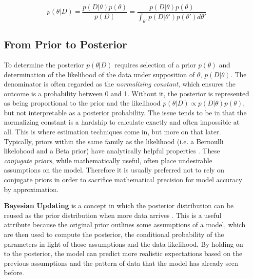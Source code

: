 $$
p(\theta|D) = \frac{p(D|\theta)p(\theta)}{p(D)} = \frac{p(D|\theta)p(\theta)}{\int_{\theta'} p(D|\theta')p(\theta')d\theta'}
$$


\subsection{From Prior to Posterior}

To determine the posterior $p(\theta|D)$ requires selection of a prior $p(\theta)$ and determination of the likelihood of the data under supposition of $\theta$, $p(D|\theta)$.  The denominator is often regarded as the \textit{normalizing constant}, which ensures the outcome is a probability between 0 and 1.  Without it, the posterior is represented as being proportional to the prior and the likelihood $p(\theta|D) \propto p(D|\theta)p(\theta)$, but not interpretable as a posterior probability.  The issue tends to be in that the normalizing constant is a hardship to calculate exactly and often impossible at all.  This is where estimation techniques come in, but more on that later.
Typically, priors within the same family as the likelihood (i.e. a Bernoulli likelohood and a Beta prior) have analytically helpful properties \cite{mullachery2018bayesian}. These \textit{conjugate priors}, while mathematically useful, often place undesirable assumptions on the model.  Therefore it is usually preferred not to rely on conjugate priors in order to sacrifice mathematical precision for model accuracy by approximation.

\textbf{Bayesian Updating} is a concept in which the posterior distribution can be reused as the prior distribution when more data arrives \cite{mcelreath2016statistical}.  This is a useful attribute because the original prior outlines some assumptions of a model, which are then used to compute the posterior, the conditional probability of the parameters in light of those assumptions and the data likelihood.  By holding on to the posterior, the model can predict more realistic expectations based on the previous assumptions and the pattern of data that the model has already seen before.





